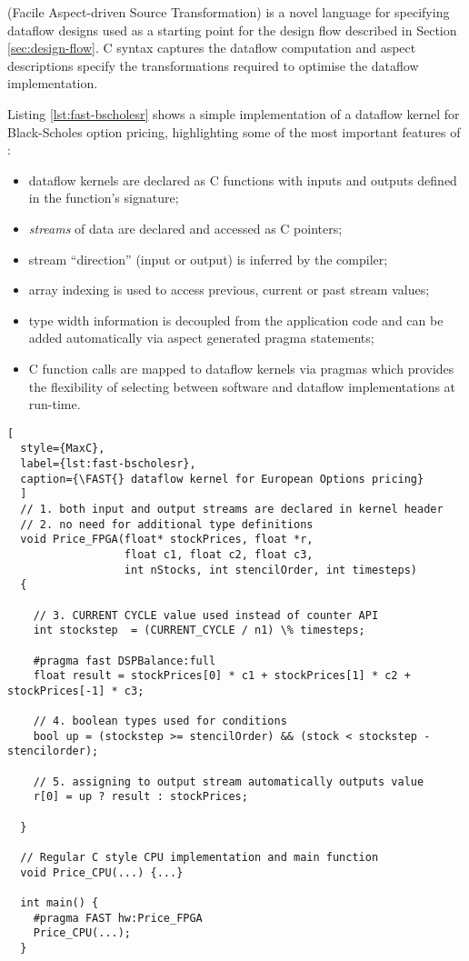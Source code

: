 \label{sec:fast}

\FAST{} (Facile Aspect-driven Source Transformation) is a novel
language for specifying dataflow designs used as a starting point for
the design flow described in Section \ref{sec:design-flow}. C syntax
captures the dataflow computation and aspect descriptions specify the
transformations required to optimise the dataflow implementation.

Listing \ref{lst:fast-bscholesr} shows a simple implementation of a
dataflow kernel for Black-Scholes option pricing, highlighting some
of the most important features of \FAST{}:
\begin{itemize}
\item dataflow kernels are declared as C functions with inputs and
  outputs defined in the function's signature;
\item \emph{streams} of data are declared and accessed as C pointers;
\item stream ``direction'' (input or output) is inferred by the compiler;
\item array indexing is used to access previous, current or past
  stream values;
\item type width information is decoupled from the application code
  and can be added automatically via aspect generated pragma
  statements;
\item C function calls are mapped to dataflow kernels via pragmas
  which provides the flexibility of selecting between software
  and dataflow implementations at run-time.
\end{itemize}

\begin{lstlisting}[
  style={MaxC},
  label={lst:fast-bscholesr},
  caption={\FAST{} dataflow kernel for European Options pricing}
  ]
  // 1. both input and output streams are declared in kernel header
  // 2. no need for additional type definitions
  void Price_FPGA(float* stockPrices, float *r,
                  float c1, float c2, float c3,
                  int nStocks, int stencilOrder, int timesteps)
  {

    // 3. CURRENT CYCLE value used instead of counter API
    int stockstep  = (CURRENT_CYCLE / n1) \% timesteps;

    #pragma fast DSPBalance:full
    float result = stockPrices[0] * c1 + stockPrices[1] * c2 + stockPrices[-1] * c3;

    // 4. boolean types used for conditions
    bool up = (stockstep >= stencilOrder) && (stock < stockstep - stencilorder);

    // 5. assigning to output stream automatically outputs value
    r[0] = up ? result : stockPrices;

  }

  // Regular C style CPU implementation and main function
  void Price_CPU(...) {...}

  int main() {
    #pragma FAST hw:Price_FPGA
    Price_CPU(...);
  }
\end{lstlisting}


